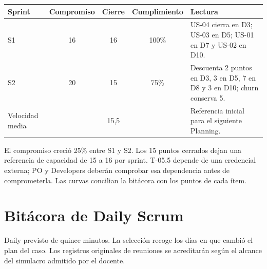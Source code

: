 \documentclass[10pt,a4paper]{article}
\begin{document}
\newpage
{\small
\begin{tabularx}{\linewidth}{@{}l c c c L@{}}
\toprule
Sprint & Compromiso & Cierre & Cumplimiento & Lectura \\
\midrule
S1 & 16 & 16 & 100\% & US-04 cierra en D3; US-03 en D5; US-01 en D7 y US-02 en D10. \\
S2 & 20 & 15 & 75\% & Descuenta 2 puntos en D3, 3 en D5, 7 en D8 y 3 en D10; churn conserva 5. \\
\midrule
Velocidad media & & 15,5 & & Referencia inicial para el siguiente Planning. \\
\bottomrule
\end{tabularx}}

El compromiso creció 25\% entre S1 y S2. Los 15 puntos cerrados dejan una referencia de capacidad de
15 a 16 por sprint. T-05.5 depende de una credencial externa; PO y Developers deberán comprobar esa
dependencia antes de comprometerla. Las curvas concilian la bitácora con los puntos de cada ítem.

\section{Bitácora de Daily Scrum}
Daily previsto de quince minutos. La selección recoge los días en que cambió el plan del caso.
Los registros originales de reuniones se acreditarán según el alcance del simulacro admitido por el docente.
\end{document}
